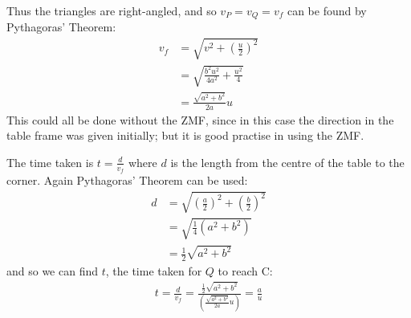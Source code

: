 \begin{hint}
{\begin{enumerate}
Thus the triangles are right-angled, and so $v_{P} = v_{Q} = v_{f}$ can be found by Pythagoras' Theorem:
\begin{align*} v_{f} &= \sqrt{ v^{2} + \left(\frac{u}{2}\right)^{2}} \\ &= \sqrt{ \frac{b^{2}u^{2}}{4a^{2}} + \frac{u^{2}}{4}} \\ &= \frac{\sqrt{a^{2} + b^{2}}}{2a} u \end{align*}
This could all be done without the ZMF, since in this case the direction in the table frame was given initially; but it is good practise in using the ZMF.

The time taken is $t = \frac{d}{v_{f}}$ where $d$ is the length from the centre of the table to the corner. Again Pythagoras' Theorem can be used:
\begin{align*} d &= \sqrt{ \left(\frac{a}{2}\right)^{2} + \left(\frac{b}{2}\right)^{2} } \\ &= \sqrt{\frac{1}{4}(a^{2} + b^{2})} \\ &= \frac{1}{2}\sqrt{a^{2} + b^{2}} \end{align*}
and so we can find $t$, the time taken for $Q$ to reach C:
\begin{align*} t = \frac{d}{v_{f}} = \frac{\frac{1}{2}\sqrt{a^{2} + b^{2}}}{\left(\frac{\sqrt{a^{2} + b^{2}}}{2a} u\right)} = \frac{a}{u} \end{align*}

\end{enumerate}
}
\end{hint}